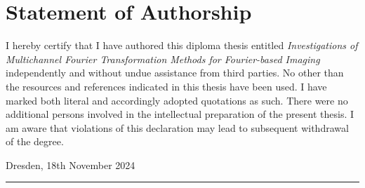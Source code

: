 \documentclass[a4paper,english,numbers=noenddot,bibtotoc,BCOR=1.5cm,headsepline,DIV=12,appendixprefix,final,openany]{scrbook}
\begin{document}
\chapter*{Statement of Authorship}
    \begin{center}
        \vspace*{\fill}
            \begin{flushleft}
                I hereby certify that I have authored this diploma thesis entitled \textit{Investigations of Multichannel Fourier Transformation Methods for Fourier-based Imaging} independently and without undue assistance from third parties. No other than the resources and references indicated in this thesis have been used. I have marked both literal and accordingly adopted quotations as such. There were no additional persons involved in the intellectual preparation of the present thesis. I am aware that violations of this declaration may lead to subsequent withdrawal of the degree.\\[1cm]
                \begin{minipage}{0.5\textwidth}
                    Dresden, 18th November 2024
                \end{minipage}
                \hfill
                \begin{minipage}{0.4\textwidth}
                    \rule[-1.8ex]{5cm}{0.4pt}
                \end{minipage}
            \end{flushleft}
        \vspace*{\fill}
\end{center}

\newpage
{}
\end{document}
